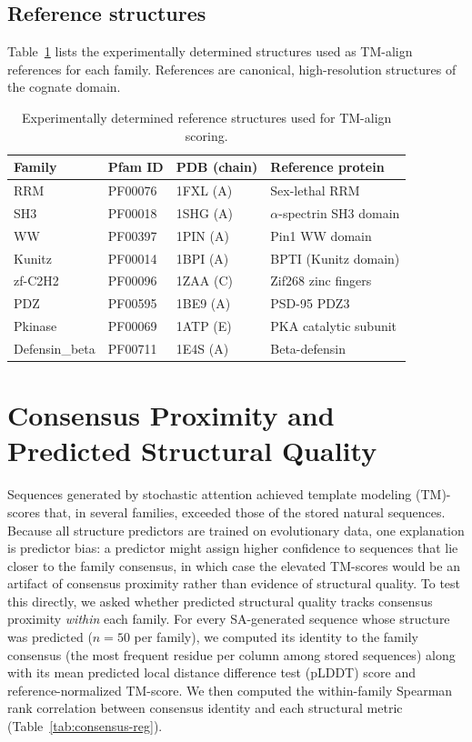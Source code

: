 \documentclass[10pt]{article}
\begin{document}
\subsection*{Reference structures}
Table~\ref{tab:pdb-refs} lists the experimentally determined structures used as TM-align references for each family. References are canonical, high-resolution structures of the cognate domain.

\begin{table}[ht]
\centering
\caption{Experimentally determined reference structures used for TM-align scoring.}
\label{tab:pdb-refs}
\small
\begin{tabular}{@{}llll@{}}
\toprule
Family & Pfam ID & PDB (chain) & Reference protein \\
\midrule
RRM            & PF00076 & 1FXL (A) & Sex-lethal RRM \\
SH3            & PF00018 & 1SHG (A) & $\alpha$-spectrin SH3 domain \\
WW             & PF00397 & 1PIN (A) & Pin1 WW domain \\
Kunitz         & PF00014 & 1BPI (A) & BPTI (Kunitz domain) \\
zf-C2H2        & PF00096 & 1ZAA (C) & Zif268 zinc fingers \\
PDZ            & PF00595 & 1BE9 (A) & PSD-95 PDZ3 \\
Pkinase        & PF00069 & 1ATP (E) & PKA catalytic subunit \\
Defensin\_beta & PF00711 & 1E4S (A) & Beta-defensin \\
\bottomrule
\end{tabular}
\end{table}

\section{Consensus Proximity and Predicted Structural Quality}\label{si:consensus-reg}

Sequences generated by stochastic attention achieved template modeling (TM)-scores that, in several families, exceeded those of the stored natural sequences. Because all structure predictors are trained on evolutionary data, one explanation is predictor bias: a predictor might assign higher confidence to sequences that lie closer to the family consensus, in which case the elevated TM-scores would be an artifact of consensus proximity rather than evidence of structural quality. To test this directly, we asked whether predicted structural quality tracks consensus proximity \emph{within} each family. For every SA-generated sequence whose structure was predicted ($n{=}50$ per family), we computed its identity to the family consensus (the most frequent residue per column among stored sequences) along with its mean predicted local distance difference test (pLDDT) score and reference-normalized TM-score. We then computed the within-family Spearman rank correlation between consensus identity and each structural metric (Table~\ref{tab:consensus-reg}).
\end{document}
